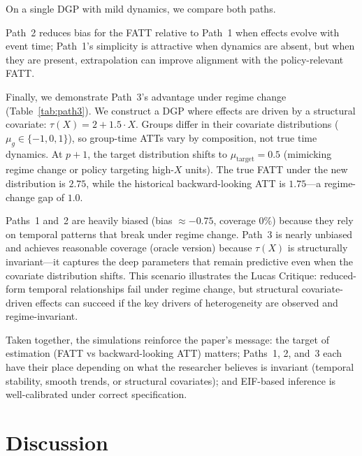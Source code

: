\documentclass{article}
\begin{document}
On a single DGP with mild dynamics, we compare both paths.

Path~2 reduces bias for the FATT relative to Path~1 when effects evolve with event time; Path~1's simplicity is attractive when dynamics are absent, but when they are present, extrapolation can improve alignment with the policy-relevant FATT.

Finally, we demonstrate Path~3's advantage under regime change (Table~\ref{tab:path3}). We construct a DGP where effects are driven by a structural covariate: $\tau(X) = 2 + 1.5 \cdot X$. Groups differ in their covariate distributions ($\mu_g \in \{-1, 0, 1\}$), so group-time ATTs vary by composition, not true time dynamics. At $p+1$, the target distribution shifts to $\mu_{\text{target}} = 0.5$ (mimicking regime change or policy targeting high-$X$ units). The true FATT under the new distribution is $2.75$, while the historical backward-looking ATT is $1.75$---a regime-change gap of $1.0$.

Paths~1 and~2 are heavily biased (bias $\approx -0.75$, coverage $0\%$) because they rely on temporal patterns that break under regime change. Path~3 is nearly unbiased and achieves reasonable coverage (oracle version) because $\tau(X)$ is structurally invariant---it captures the deep parameters that remain predictive even when the covariate distribution shifts. This scenario illustrates the Lucas Critique: reduced-form temporal relationships fail under regime change, but structural covariate-driven effects can succeed if the key drivers of heterogeneity are observed and regime-invariant.

Taken together, the simulations reinforce the paper's message: the target of estimation (FATT vs backward-looking ATT) matters; Paths~1, 2, and~3 each have their place depending on what the researcher believes is invariant (temporal stability, smooth trends, or structural covariates); and EIF-based inference is well-calibrated under correct specification.

\section{Discussion}
\end{document}
